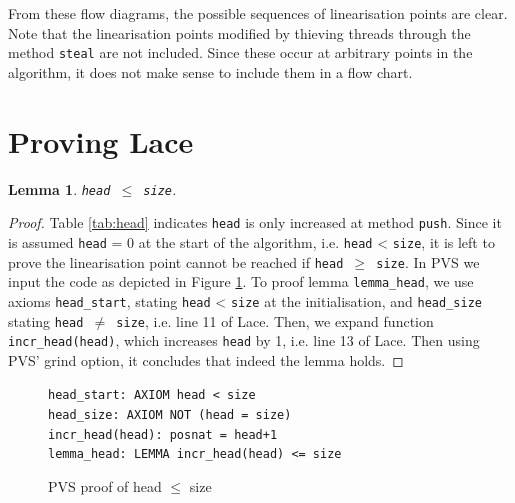 \documentclass{sig-alternate-br}
\newtheorem{lemma}{Lemma}
\begin{document}
From these flow diagrams, the possible sequences of linearisation points are clear.
Note that the linearisation points modified by thieving threads through the method \texttt{steal} are not included.
Since these occur at arbitrary points in the algorithm, it does not make sense to include them in a flow chart.

\section{Proving Lace}
\begin{lemma}
	\texttt{head $\leq$ size}.
	\label{lem:headsize}
\end{lemma}
\begin{proof}
	Table \ref{tab:head} indicates \texttt{head} is only increased at method \texttt{push}.
	Since it is assumed \texttt{head} = 0 at the start of the algorithm, i.e. \texttt{head} < \texttt{size}, it is left to prove the linearisation point cannot be reached if \texttt{head $\geq$ size}.
	In PVS we input the code as depicted in Figure \ref{pvs:head}.
	To proof lemma \texttt{lemma\_head}, we use axioms \texttt{head\_start}, stating \texttt{head} < \texttt{size} at the initialisation, and \texttt{head\_size} stating \texttt{head $\neq$ size}, i.e. line 11 of Lace.
	Then, we expand function \texttt{incr\_head(head)}, which increases \texttt{head} by 1, i.e. line 13 of Lace.
	Then using PVS' grind option, it concludes that indeed the lemma holds.
\end{proof}
\begin{figure}[h]
	\texttt{head\_start: AXIOM head < size}\\
	\texttt{head\_size: AXIOM NOT (head = size)}\\
	\texttt{incr\_head(head): posnat = head+1}\\
	\texttt{lemma\_head: LEMMA incr\_head(head) <= size}
	\caption{PVS proof of head $\leq$ size}
	\label{pvs:head}
\end{figure}
\end{document}
